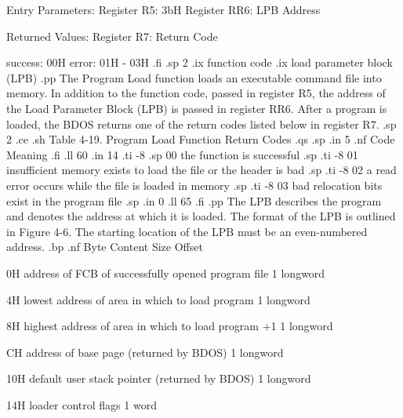             Entry Parameters:  
               Register   R5:  3bH
               Register  RR6:  LPB Address

            Returned  Values:
               Register   R7:  Return Code

                                success:  00H
                                  error:  01H - 03H
.fi
.sp 2
.ix function code
.ix load parameter block (LPB)
.pp
The Program Load function loads an executable command file into
memory.  In addition to the function code, passed in register
  R5, the address of the Load Parameter Block (LPB) is passed in
register  RR6.  After a program is loaded, the BDOS returns one
of the return codes listed below in register   R7. 
.sp 2
.ce
.sh
Table 4-19.  Program Load Function Return Codes
.qs
.sp
.in 5
.nf
Code                         Meaning
.fi
.ll 60
.in 14
.ti -8
.sp
00      the function is successful
.sp
.ti -8
01      insufficient memory exists to load the file or the header is bad
.sp
.ti -8
02      a read error occurs while the file is loaded in memory
.sp
.ti -8
03      bad relocation bits exist in the program file 
.sp
.in 0
.ll 65
.fi
.pp
The LPB describes the program and denotes the address at which it is loaded.  
The format of the LPB is outlined in Figure 4-6.  The starting location of 
the LPB must be an even-numbered address.
.bp
.nf
Byte                    Content                            Size
Offset         


 0H  address of FCB of successfully opened program file   1 longword 

 4H  lowest address of area in which to load program      1 longword

 8H  highest address of area in which to load program +1  1 longword

 CH  address of base page        (returned by BDOS)       1 longword

10H  default user stack pointer  (returned by BDOS)       1 longword

14H  loader control flags                                 1 word

